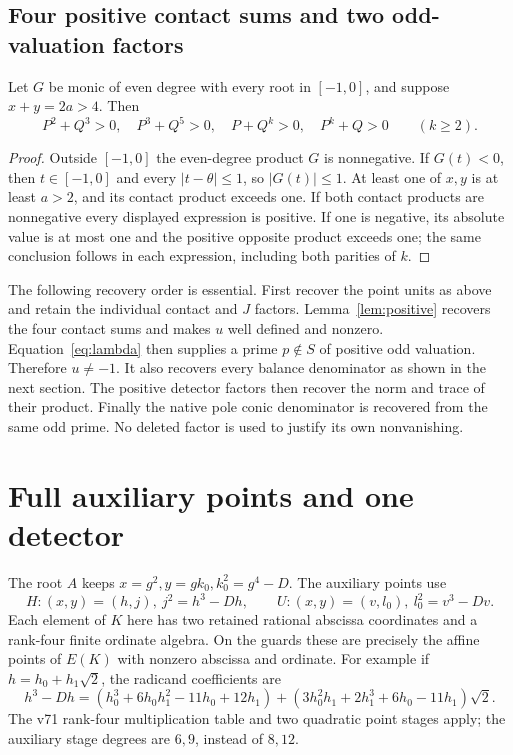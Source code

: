\documentclass[11pt,a4paper]{article}
\begin{document}
\subsection{Four positive contact sums and two odd-valuation factors}
\begin{lemma}\label{lem:positive}
Let $G$ be monic of even degree with every root in $[-1,0]$, and suppose
$x+y=2a>4$. Then
\[
 P^2+Q^3>0,\quad P^3+Q^5>0,\quad P+Q^k>0,\quad P^k+Q>0
 \qquad(k\ge2).
\]
\end{lemma}
\begin{proof}
Outside $[-1,0]$ the even-degree product $G$ is nonnegative. If $G(t)<0$,
then $t\in[-1,0]$ and every $|t-\theta|\le1$, so $|G(t)|\le1$.
At least one of $x,y$ is at least $a>2$, and its contact product exceeds
one. If both contact products are nonnegative every displayed expression
is positive. If one is negative, its absolute value is at most one and
the positive opposite product exceeds one; the same conclusion follows
in each expression, including both parities of $k$.
\end{proof}

The following recovery order is essential. First recover the point units
as above and retain the individual contact and $J$ factors. Lemma~\ref{lem:positive}
recovers the four contact sums and makes $u$ well defined and nonzero.
Equation~\eqref{eq:lambda} then supplies a prime $p\notin S$ of positive
odd valuation. Therefore $u\ne-1$. It also recovers every balance
denominator as shown in the next section. The positive detector factors
then recover the norm and trace of their product. Finally the native pole
conic denominator is recovered from the same odd prime. No deleted
factor is used to justify its own nonvanishing.

\section{Full auxiliary points and one detector}
The root $A$ keeps $x=g^2,y=gk_0,k_0^2=g^4-D$. The auxiliary points use
\[
 H:(x,y)=(h,j),\ j^2=h^3-Dh,\qquad
 U:(x,y)=(v,l_0),\ l_0^2=v^3-Dv.
\]
Each element of $K$ here has two retained rational abscissa coordinates
and a rank-four finite ordinate algebra. On the guards these are precisely
the affine points of $E(K)$ with nonzero abscissa and ordinate.
For example if $h=h_0+h_1\sqrt2$, the radicand coefficients are
\[
 h^3-Dh=(h_0^3+6h_0h_1^2-11h_0+12h_1)
 +(3h_0^2h_1+2h_1^3+6h_0-11h_1)\sqrt2.
\]
The v71 rank-four multiplication table and two quadratic point stages
apply; the auxiliary stage degrees are $6,9$, instead of $8,12$.
\end{document}
